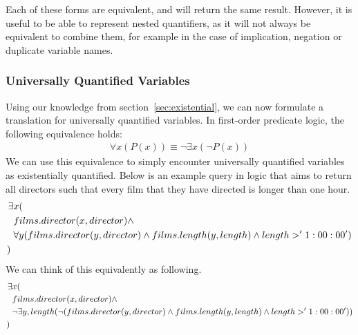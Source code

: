 \documentclass[a4paper, 11pt]{article}
\begin{document}
    Each of these forms are equivalent, and will return the same result.
    However, it is useful to be able to represent nested quantifiers, as it
    will not always be equivalent to combine them, for example in the case
    of implication, negation or duplicate variable names.\cite{washEQUIV}

    \subsubsection{Universally Quantified Variables}
    Using our knowledge from section~\ref{sec:existential}, we can now
    formulate a translation for universally quantified variables. In
    first-order predicate logic, the following equivalence holds:
    \begin{gather}
      \forall x(P(x)) \equiv \lnot \exists x(\lnot P(x))
    \end{gather}
    We can use this equivalence to simply encounter universally quantified
    variables as existentially quantified. Below is an example query in logic
    that aims to return all directors such that every film that they have
    directed is longer than one hour.
    \begin{align*}
      \exists &x(                                                                                                 \\
              & films.director(x, director) \land                                                                 \\ 
              & \forall y(films.director(y, director) \land films.length(y, length) \land length > '1:00:00')     \\
      ) \hspace{1mm} &
    \end{align*}
    We can think of this equivalently as following.
    \begin{align*}
      \exists &x(                                                                                                                   \\
                & films.director(x, director) \land                                                                                 \\
                & \lnot \exists y,length(\lnot(films.director(y, director) \land films.length(y, length) \land length > '1:00:00')) \\
      ) \hspace{1mm} &
    \end{align*}
\end{document}
